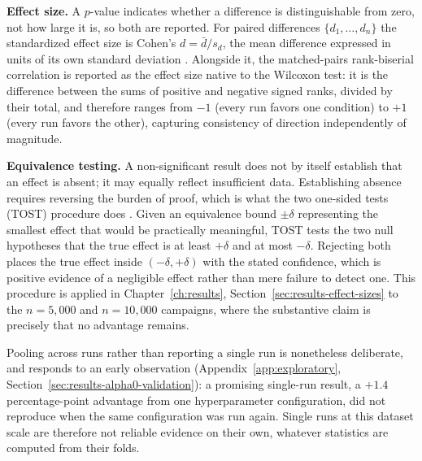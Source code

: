 \textbf{Effect size.} A $p$-value indicates whether a difference is
distinguishable from zero, not how large it is, so both are reported. For paired
differences $\{d_1, \ldots, d_n\}$ the standardized effect size is Cohen's $d =
\bar{d} / s_d$, the mean difference expressed in units of its own standard
deviation \citep{cohen1988statistical}. Alongside it, the matched-pairs
rank-biserial correlation is reported as the effect size native to the Wilcoxon
test: it is the difference between the sums of positive and negative signed
ranks, divided by their total, and therefore ranges from $-1$ (every run favors
one condition) to $+1$ (every run favors the other), capturing consistency of
direction independently of magnitude.

\textbf{Equivalence testing.} A non-significant result does not by itself
establish that an effect is absent; it may equally reflect insufficient data.
Establishing absence requires reversing the burden of proof, which is what the
two one-sided tests (TOST) procedure does \citep{lakens2017equivalence}. Given an
equivalence bound $\pm\delta$ representing the smallest effect that would be
practically meaningful, TOST tests the two null hypotheses that the true effect
is at least $+\delta$ and at most $-\delta$. Rejecting both places the true
effect inside $(-\delta, +\delta)$ with the stated confidence, which is positive
evidence of a negligible effect rather than mere failure to detect one. This
procedure is applied in Chapter~\ref{ch:results},
Section~\ref{sec:results-effect-sizes} to the $n=5{,}000$ and $n=10{,}000$
campaigns, where the substantive claim is precisely that no advantage remains.

Pooling across runs rather than reporting a single run is nonetheless deliberate,
and responds to an early observation (Appendix~\ref{app:exploratory},
Section~\ref{sec:results-alpha0-validation}): a promising single-run result, a
$+1.4$ percentage-point advantage from one hyperparameter configuration, did not
reproduce when the same configuration was run again. Single runs at this dataset
scale are therefore not reliable evidence on their own, whatever statistics are
computed from their folds.

